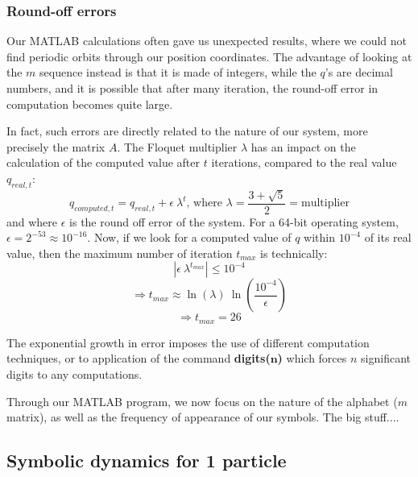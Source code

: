 \subsubsection{Round-off errors}

Our MATLAB calculations often gave us unexpected results, where we could
not find periodic orbits through our position coordinates. The advantage
of looking at the $m$ sequence instead is that it is made of integers,
while the $q$'s are decimal numbers, and it is possible that after many
iteration, the round-off error in computation becomes quite large.

In fact, such errors are directly related to the nature of our system, more
precisely the matrix $A$. The Floquet multiplier $\lambda$ has an impact
on the calculation of the computed value after $t$ iterations, compared
to the real value $q_{real,t}$:
\[
q_{computed,t} = q_{real,t} + \epsilon \: \lambda^{t} \text{, where } \lambda = \frac{3+\sqrt{5}}{2} = \text{multiplier}
\]
and where $\epsilon$ is the round off error of the system. For a 64-bit
operating system, $\epsilon  = 2^{-53} \approx 10^{-16}$. Now, if we look
for a computed value of $q$ within $10^{-4}$ of its real value, then the
maximum number of iteration $t_{max}$ is technically:
\[
|\epsilon \: \lambda^{t_{max}}| \leq 10^{-4}
\]
\[
\Rightarrow t_{max} \approx \ln(\lambda) \: \ln(\frac{10^{-4}}{\epsilon})
\]
\[
\Rightarrow t_{max} = 26
\]

The exponential growth in error imposes the use of different computation
techniques, or to application of the command
\textbf{digits($\mathbf{n}$)} which forces $n$ significant digits to any
computations.

Through our MATLAB program, we now focus on the nature of the alphabet
($m$ matrix), as well as the frequency of appearance of our symbols. The
big stuff....

\subsection{Symbolic dynamics for 1 particle}
\label{AKSalphabet1particle}

